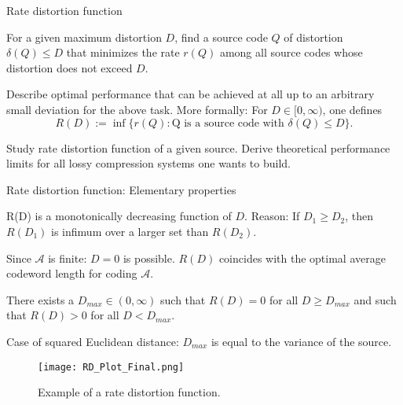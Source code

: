 \begin{frame}{Rate distortion function}
\bit
\item[]For a given maximum distortion $D$, find a source code $Q$ of distortion $\delta(Q)\leq D$ that minimizes the rate $r(Q)$ among 
all source codes whose distortion does not exceed $D$.
\eit 

\bit
\item[] Describe optimal performance that can be achieved at all up to an arbitrary small deviation for the above task.
More formally: For $D\in[0,\infty)$, one defines
\begin{equation*}
\boxed{R(D):= \inf\{r(Q)\colon \text{Q is a source code with } \delta(Q)\leq D \}.} 
\end{equation*}
\eit 

\bit
\item[] Study rate distortion function of a given source. Derive theoretical performance limits for all lossy compression systems one wants to build. 
\eit 

  

\end{frame}


\begin{frame}{Rate distortion function: Elementary properties}
\bit
\item R(D) is a monotonically decreasing function of $D$.  Reason: If $D_1\geq D_2$, then $R(D_1)$ is infimum over a larger 
set than $R(D_2)$.

\item Since $\mathcal{A}$ is finite: $D=0$ is possible. $R(D)$ coincides with the optimal average codeword length for coding $\mathcal{A}$. 
\item There exists a $D_{max}\in (0,\infty)$ such that $R(D)=0$ for all $D\geq D_{max}$ and such that $R(D)>0$ for all $D<D_{max}$. 
\item Case of squared Euclidean distance: $D_{max}$ is equal to the variance of the source. 
\eit

\begin{center}
\begin{figure}
\texttt{[image: RD\_Plot\_Final.png]}
\captionsetup{labelformat=empty}
\caption{Example of a rate distortion function.}
\end{figure}
\end{center}

\end{frame}





